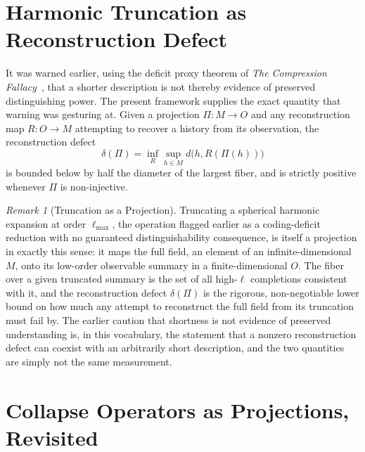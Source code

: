 \documentclass[11pt,fleqn]{book}
\numberwithin{equation}{chapter}
\theoremstyle{plain}
\theoremstyle{definition}
\theoremstyle{remark}
\newtheorem{remark}[theorem]{Remark}
\begin{document}
\section{Harmonic Truncation as Reconstruction Defect}

It was warned earlier, using the deficit proxy theorem of \emph{The Compression Fallacy}~\cite{compression-fallacy}, that a shorter description is not thereby evidence of preserved distinguishing power. The present framework supplies the exact quantity that warning was gesturing at. Given a projection \(\Pi:M\to O\) and any reconstruction map \(R:O\to M\) attempting to recover a history from its observation, the reconstruction defect
\begin{equation}
\delta(\Pi) = \inf_R \sup_{h\in M} d\bigl(h, R(\Pi(h))\bigr)
\end{equation}
is bounded below by half the diameter of the largest fiber, and is strictly positive whenever \(\Pi\) is non-injective.

\begin{remark}[Truncation as a Projection]
Truncating a spherical harmonic expansion at order \(\ell_{\max}\), the operation flagged earlier as a coding-deficit reduction with no guaranteed distinguishability consequence, is itself a projection in exactly this sense: it maps the full field, an element of an infinite-dimensional \(M\), onto its low-order observable summary in a finite-dimensional \(O\). The fiber over a given truncated summary is the set of all high-\(\ell\) completions consistent with it, and the reconstruction defect \(\delta(\Pi)\) is the rigorous, non-negotiable lower bound on how much any attempt to reconstruct the full field from its truncation must fail by. The earlier caution that shortness is not evidence of preserved understanding is, in this vocabulary, the statement that a nonzero reconstruction defect can coexist with an arbitrarily short description, and the two quantities are simply not the same measurement.
\end{remark}

\section{Collapse Operators as Projections, Revisited}
\end{document}
